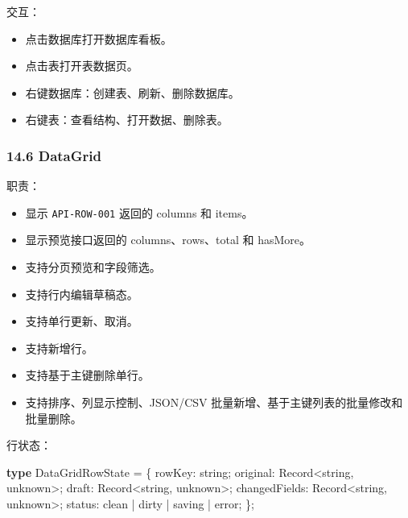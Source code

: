 \documentclass[
  a4paper,
  UTF8]{ctexart}
\newenvironment{Shaded}{}{}
\newcommand{\BuiltInTok}[1]{#1}
\newcommand{\DataTypeTok}[1]{\textcolor[rgb]{0.56,0.13,0.00}{#1}}
\newcommand{\KeywordTok}[1]{\textcolor[rgb]{0.00,0.44,0.13}{\textbf{#1}}}
\newcommand{\NormalTok}[1]{#1}
\newcommand{\OperatorTok}[1]{\textcolor[rgb]{0.40,0.40,0.40}{#1}}
\newcommand{\StringTok}[1]{\textcolor[rgb]{0.25,0.44,0.63}{#1}}
\providecommand{\tightlist}{%
  \setlength{\itemsep}{0pt}\setlength{\parskip}{0pt}}
\begin{document}
交互：

\begin{itemize}
\tightlist
\item
  点击数据库打开数据库看板。
\item
  点击表打开表数据页。
\item
  右键数据库：创建表、刷新、删除数据库。
\item
  右键表：查看结构、打开数据、删除表。
\end{itemize}

\hypertarget{datagrid}{%
\subsubsection{14.6 DataGrid}\label{datagrid}}

职责：

\begin{itemize}
\tightlist
\item
  显示 \texttt{API-ROW-001} 返回的 columns 和 items。
\item
  显示预览接口返回的 columns、rows、total 和 hasMore。
\item
  支持分页预览和字段筛选。
\item
  支持行内编辑草稿态。
\item
  支持单行更新、取消。
\item
  支持新增行。
\item
  支持基于主键删除单行。
\item
  支持排序、列显示控制、JSON/CSV
  批量新增、基于主键列表的批量修改和批量删除。
\end{itemize}

行状态：

\begin{Shaded}
\begin{Highlighting}[]
\KeywordTok{type}\NormalTok{ DataGridRowState }\OperatorTok{=}\NormalTok{ \{}
\NormalTok{  rowKey}\OperatorTok{:} \DataTypeTok{string}\OperatorTok{;}
\NormalTok{  original}\OperatorTok{:} \BuiltInTok{Record}\OperatorTok{\textless{}}\DataTypeTok{string}\OperatorTok{,} \DataTypeTok{unknown}\OperatorTok{\textgreater{};}
\NormalTok{  draft}\OperatorTok{:} \BuiltInTok{Record}\OperatorTok{\textless{}}\DataTypeTok{string}\OperatorTok{,} \DataTypeTok{unknown}\OperatorTok{\textgreater{};}
\NormalTok{  changedFields}\OperatorTok{:} \BuiltInTok{Record}\OperatorTok{\textless{}}\DataTypeTok{string}\OperatorTok{,} \DataTypeTok{unknown}\OperatorTok{\textgreater{};}
\NormalTok{  status}\OperatorTok{:} \StringTok{\textquotesingle{}clean\textquotesingle{}} \OperatorTok{|} \StringTok{\textquotesingle{}dirty\textquotesingle{}} \OperatorTok{|} \StringTok{\textquotesingle{}saving\textquotesingle{}} \OperatorTok{|} \StringTok{\textquotesingle{}error\textquotesingle{}}\OperatorTok{;}
\NormalTok{\}}\OperatorTok{;}
\end{Highlighting}
\end{Shaded}
\end{document}

